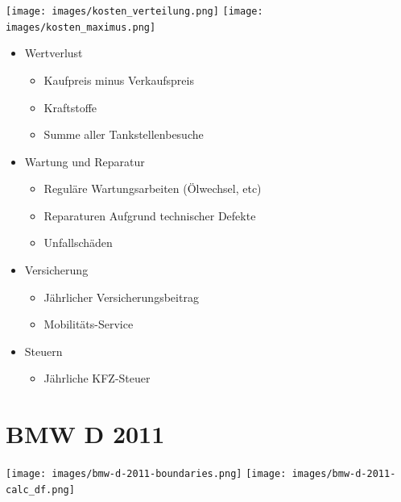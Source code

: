\documentclass[landscape, DIV=99, 14pt]{scrartcl}
\begin{document}
\twocolumn
\texttt{[image: images/kosten\_verteilung.png]}
\texttt{[image: images/kosten\_maximus.png]}

\pagebreak

\begin{itemize}
    \item Wertverlust
    \begin{itemize}
        \item Kaufpreis minus Verkaufspreis
        \item Kraftstoffe
        \item Summe aller Tankstellenbesuche
    \end{itemize}
    \item Wartung und Reparatur
    \begin{itemize}
        \item Regul\"are Wartungsarbeiten (\"Olwechsel, etc)
        \item Reparaturen Aufgrund technischer Defekte
        \item Unfallsch\"aden
    \end{itemize}
    \item Versicherung
    \begin{itemize}
        \item J\"ahrlicher Versicherungsbeitrag
        \item Mobilit\"ats-Service
    \end{itemize}
    \item Steuern
    \begin{itemize}
            \item J\"ahrliche KFZ-Steuer
    \end{itemize}
\end{itemize}


\twocolumn

\section*{BMW D 2011}
\begin{center}
\texttt{[image: images/bmw-d-2011-boundaries.png]}
\null
\vspace{0.5cm}
\texttt{[image: images/bmw-d-2011-calc\_df.png]}
\end{center}
\end{document}

